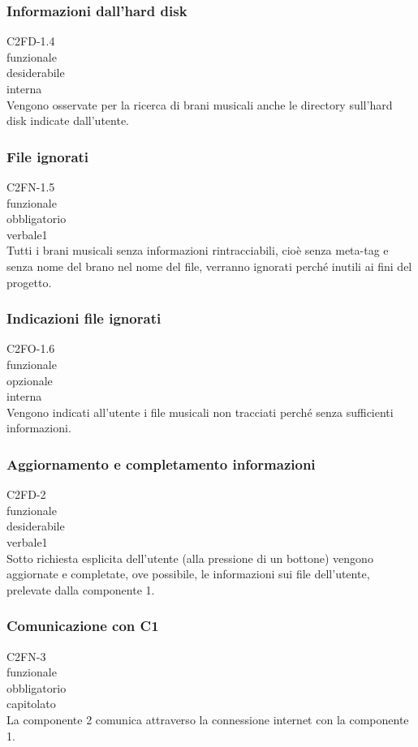 \subsubsection*{Informazioni dall'hard disk}
 C2FD-1.4 \\
 funzionale \\
 desiderabile \\
 interna \\
Vengono osservate per la ricerca di brani musicali anche le directory sull'hard
disk indicate dall'utente.

\subsubsection*{File ignorati}
 C2FN-1.5 \\
 funzionale \\
 obbligatorio \\
 verbale1 \\
Tutti i brani musicali senza informazioni rintracciabili, cio\`e senza meta-tag e
senza nome del brano nel nome del file, verranno ignorati perch\'e inutili ai fini
del progetto.

\subsubsection*{Indicazioni file ignorati}
 C2FO-1.6 \\
 funzionale \\
 opzionale \\
 interna \\
Vengono indicati all'utente i file musicali non tracciati perch\'e senza
sufficienti informazioni.

\subsubsection*{Aggiornamento e completamento informazioni}
 C2FD-2 \\
 funzionale \\
 desiderabile \\
 verbale1 \\
Sotto richiesta esplicita dell'utente (alla pressione di un bottone) vengono
aggiornate e completate, ove possibile, le informazioni sui file dell'utente,
prelevate dalla componente 1.

\subsubsection*{Comunicazione con C1}
 C2FN-3 \\
 funzionale \\
 obbligatorio \\
 capitolato \\
La componente 2 comunica attraverso la connessione internet con la componente 1.

